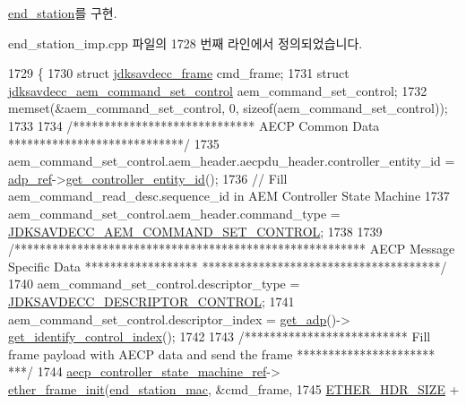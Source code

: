 \hyperlink{classavdecc__lib_1_1end__station_af0d6fb82fdf81914bb248266625f8cea}{end\+\_\+station}를 구현.



end\+\_\+station\+\_\+imp.\+cpp 파일의 1728 번째 라인에서 정의되었습니다.


\begin{DoxyCode}
1729 \{
1730     \textcolor{keyword}{struct }\hyperlink{structjdksavdecc__frame}{jdksavdecc\_frame} cmd\_frame;
1731     \textcolor{keyword}{struct }\hyperlink{structjdksavdecc__aem__command__set__control}{jdksavdecc\_aem\_command\_set\_control} aem\_command\_set\_control;
1732     memset(&aem\_command\_set\_control, 0, \textcolor{keyword}{sizeof}(aem\_command\_set\_control));
1733 
1734     \textcolor{comment}{/***************************** AECP Common Data ****************************/}
1735     aem\_command\_set\_control.aem\_header.aecpdu\_header.controller\_entity\_id = 
      \hyperlink{classavdecc__lib_1_1end__station__imp_a0b7b5ce956637a18c695ba20f2d4908c}{adp\_ref}->\hyperlink{classavdecc__lib_1_1adp_a0c0959a46658c0a22e9530334b2912da}{get\_controller\_entity\_id}();
1736     \textcolor{comment}{// Fill aem\_command\_read\_desc.sequence\_id in AEM Controller State Machine}
1737     aem\_command\_set\_control.aem\_header.command\_type = 
      \hyperlink{group__command_ga78648020206806d2992e010573f0ef27}{JDKSAVDECC\_AEM\_COMMAND\_SET\_CONTROL};
1738 
1739     \textcolor{comment}{/******************************************************** AECP Message Specific Data ******************
      **************************************/}
1740     aem\_command\_set\_control.descriptor\_type = \hyperlink{group__descriptor_gaafb6bdc564bbe2b62cb6f91bdb8185a8}{JDKSAVDECC\_DESCRIPTOR\_CONTROL};
1741     aem\_command\_set\_control.descriptor\_index = \hyperlink{classavdecc__lib_1_1end__station__imp_a471a74540ce6182fad0c17dfd010107e}{get\_adp}()->
      \hyperlink{classavdecc__lib_1_1adp_a5066760097c3a34b8ef11ea4a2ba8612}{get\_identify\_control\_index}();
1742 
1743     \textcolor{comment}{/************************** Fill frame payload with AECP data and send the frame **********************
      ***/}
1744     \hyperlink{namespaceavdecc__lib_a0b1b5aea3c0490f77cbfd9178af5be22}{aecp\_controller\_state\_machine\_ref}->
      \hyperlink{classavdecc__lib_1_1aecp__controller__state__machine_a86ff947c5e6b799cfb877d3767bfa1f9}{ether\_frame\_init}(\hyperlink{classavdecc__lib_1_1end__station__imp_a0e9fa7b31d903107ff9e7aac9dac172d}{end\_station\_mac}, &cmd\_frame,
1745                                                         \hyperlink{namespaceavdecc__lib_a6c827b1a0d973e18119c5e3da518e65ca9512ad9b34302ba7048d88197e0a2dc0}{ETHER\_HDR\_SIZE} + 

\end{DoxyCode}
